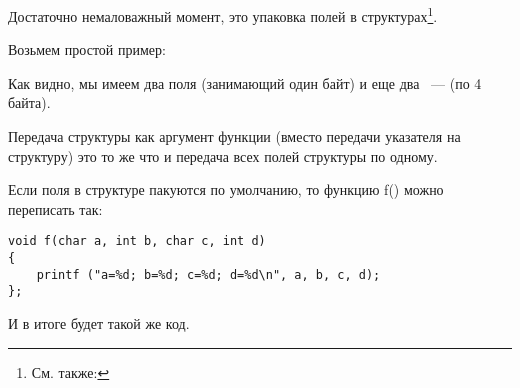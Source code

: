 \sectionold{\StructurePackingSectionName}
\label{structure_packing}

Достаточно немаловажный момент, это упаковка полей в структурах\footnote{См. также: \URLWPDA}.

Возьмем простой пример:



Как видно, мы имеем два поля \Tchar (занимающий один байт) и еще два ~--- \Tint (по 4 байта).






Передача структуры как аргумент функции (вместо передачи указателя на структуру) это то же
что и передача всех полей структуры по одному.

Если поля в структуре пакуются по умолчанию, то функцию f() можно переписать так:

\begin{lstlisting}
void f(char a, int b, char c, int d)
{
    printf ("a=%d; b=%d; c=%d; d=%d\n", a, b, c, d);
};
\end{lstlisting}

И в итоге будет такой же код.
